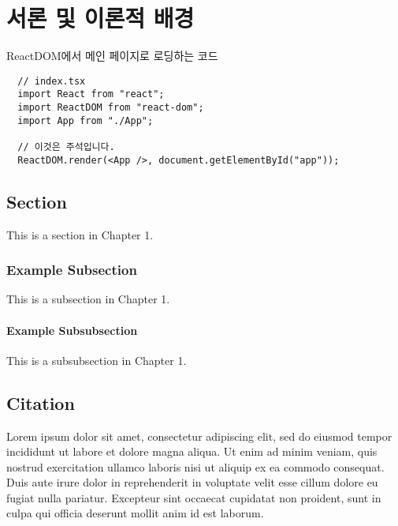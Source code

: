 \chapter{서론 및 이론적 배경}
\label{chap:introduction}

ReactDOM에서 메인 페이지로 로딩하는 코드

\begin{lstlisting}
  // index.tsx
  import React from "react";
  import ReactDOM from "react-dom";
  import App from "./App";
  
  // 이것은 주석입니다.
  ReactDOM.render(<App />, document.getElementById("app"));
\end{lstlisting}

\section{Section}
\label{sec:sec-1-1}

This is a section in Chapter 1.

\subsection{Example Subsection}
\label{subsec:sec-1-1-1}

This is a subsection in Chapter 1.

\subsubsection{Example Subsubsection}

This is a subsubsection in Chapter 1.

\section{Citation}
\label{sec:citation}

Lorem ipsum dolor sit amet, consectetur adipiscing elit, sed do eiusmod tempor incididunt ut labore et dolore magna aliqua. Ut enim ad minim veniam, quis nostrud exercitation ullamco laboris nisi ut aliquip ex ea commodo consequat. Duis aute irure dolor in reprehenderit in voluptate velit esse cillum dolore eu fugiat nulla pariatur. Excepteur sint occaecat cupidatat non proident, sunt in culpa qui officia deserunt mollit anim id est laborum.

